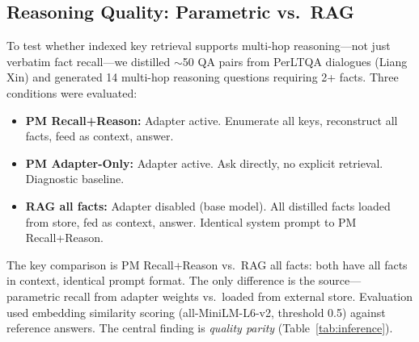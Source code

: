 \documentclass[11pt]{article}
\begin{document}
\subsection{Reasoning Quality: Parametric vs.\ RAG}
\label{sec:exp-inference}

To test whether indexed key retrieval supports multi-hop reasoning---not just verbatim fact recall---we distilled $\sim$50 QA pairs from PerLTQA dialogues (Liang Xin) and generated 14 multi-hop reasoning questions requiring 2+ facts.
Three conditions were evaluated:
\begin{itemize}
    \item \textbf{PM Recall+Reason:} Adapter active. Enumerate all keys, reconstruct all facts, feed as context, answer.
    \item \textbf{PM Adapter-Only:} Adapter active. Ask directly, no explicit retrieval. Diagnostic baseline.
    \item \textbf{RAG all facts:} Adapter disabled (base model). All distilled facts loaded from store, fed as context, answer. Identical system prompt to PM Recall+Reason.
\end{itemize}
The key comparison is PM Recall+Reason vs.\ RAG all facts: both have all facts in context, identical prompt format.
The only difference is the source---parametric recall from adapter weights vs.\ loaded from external store.
Evaluation used embedding similarity scoring (all-MiniLM-L6-v2, threshold 0.5) against reference answers.
The central finding is \emph{quality parity} (Table~\ref{tab:inference}).
\end{document}
